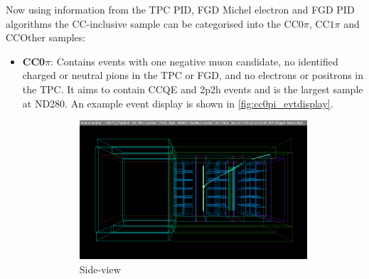 Now using information from the TPC PID, FGD Michel electron and FGD PID algorithms the \numu CC-inclusive sample can be categorised into the CC$0\pi$, CC$1\pi$ and CCOther samples:
\begin{itemize}
	\item \textbf{CC0$\pi$}: Contains events with one negative muon candidate, no identified charged or neutral pions in the TPC or FGD, and no electrons or positrons in the TPC. It aims to contain CCQE and 2p2h events and is the largest sample at ND280. An example event display is shown in \autoref{fig:cc0pi_evtdisplay}.
	\begin{figure}[h]
		\begin{subfigure}[t]{0.49\textwidth}
			\includegraphics[width=\textwidth, trim={25mm 28mm 30mm 30mm}, clip]{figures/numu/evtdisplay/CC0pi_7423_34_179070_perX0Z_all}
			\caption{Side-view}
		\end{subfigure}
		\begin{subfigure}[t]{0.49\textwidth}

\end{subfigure}
\end{figure}
\end{itemize}
